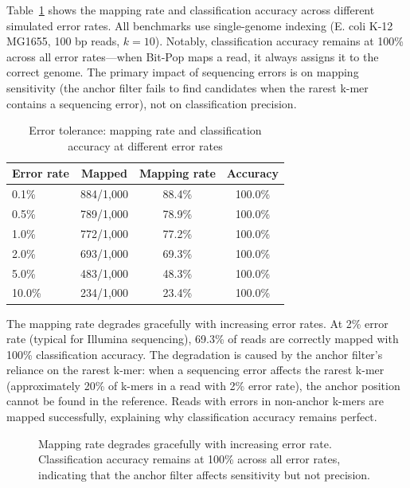 \documentclass[utf8]{article}
\begin{document}
Table~\ref{tab:error} shows the mapping rate and classification accuracy across different simulated error rates. All benchmarks use single-genome indexing (E. coli K-12 MG1655, 100 bp reads, $k=10$). Notably, classification accuracy remains at 100\% across all error rates---when Bit-Pop maps a read, it always assigns it to the correct genome. The primary impact of sequencing errors is on mapping sensitivity (the anchor filter fails to find candidates when the rarest k-mer contains a sequencing error), not on classification precision.

\begin{table}[h]
\centering
\caption{Error tolerance: mapping rate and classification accuracy at different error rates}
\label{tab:error}
\begin{tabular}{lccc}
\toprule
\textbf{Error rate} & \textbf{Mapped} & \textbf{Mapping rate} & \textbf{Accuracy} \\
\midrule
0.1\% & 884/1,000 & 88.4\% & 100.0\% \\
0.5\% & 789/1,000 & 78.9\% & 100.0\% \\
1.0\% & 772/1,000 & 77.2\% & 100.0\% \\
2.0\% & 693/1,000 & 69.3\% & 100.0\% \\
5.0\% & 483/1,000 & 48.3\% & 100.0\% \\
10.0\% & 234/1,000 & 23.4\% & 100.0\% \\
\bottomrule
\end{tabular}
\end{table}

The mapping rate degrades gracefully with increasing error rates. At 2\% error rate (typical for Illumina sequencing), 69.3\% of reads are correctly mapped with 100\% classification accuracy. The degradation is caused by the anchor filter's reliance on the rarest k-mer: when a sequencing error affects the rarest k-mer (approximately 20\% of k-mers in a read with 2\% error rate), the anchor position cannot be found in the reference. Reads with errors in non-anchor k-mers are mapped successfully, explaining why classification accuracy remains perfect.

\begin{figure}[h]
\centering
{}
\caption{Mapping rate degrades gracefully with increasing error rate. Classification accuracy remains at 100\% across all error rates, indicating that the anchor filter affects sensitivity but not precision.}
\label{fig:error}
\end{figure}
\end{document}

